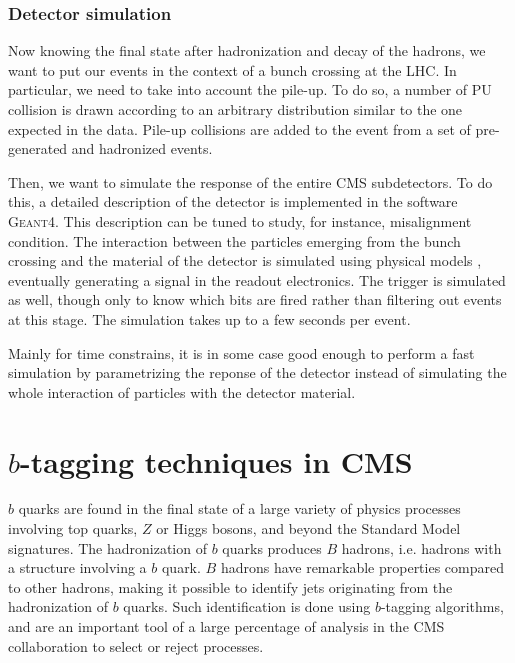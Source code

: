             \subsection{Detector simulation}

            Now knowing the final state after hadronization and decay of the hadrons, we
            want to put our events in the context of a bunch crossing at the LHC. In
            particular, we need to take into account the pile-up. To do so, a number of
            PU collision is drawn according to an arbitrary distribution similar to the
            one expected in the data. Pile-up collisions are added to the event from a
            set of pre-generated and hadronized events.

            Then, we want to simulate the response of the entire CMS subdetectors. To do
            this, a detailed description of the detector is implemented in the software
            \textsc{Geant4}. This description can be tuned to study, for instance,
            misalignment condition. The interaction between the particles emerging from
            the bunch crossing and the material of the detector is simulated using physical
            models , eventually generating a signal in
            the readout electronics. The trigger is simulated as well, though only to know
            which bits are fired rather than filtering out events at this stage. The
            simulation takes up to a few seconds per event.

            Mainly for time constrains, it is in some case good enough to perform a
            fast simulation by parametrizing the reponse of the detector instead of
            simulating the whole interaction of particles with the detector material.

\setcounter{mtc}{3}
\chapter{$b$-tagging techniques in CMS}
\minitoc
\newpage

    $b$ quarks are found in the final state of a large variety of physics processes
    involving top quarks, $Z$ or Higgs bosons, and beyond the Standard Model signatures.
    The hadronization of $b$ quarks produces $B$ hadrons, i.e. hadrons with a structure
    involving a $b$ quark. $B$ hadrons have remarkable properties compared to other hadrons,
    making it possible to identify jets originating from the hadronization of $b$ quarks.
    Such identification is done using $b$-tagging algorithms, and are an important tool of
    a large percentage of analysis in the CMS collaboration to select or reject processes.

